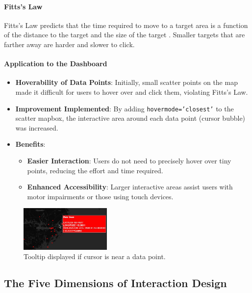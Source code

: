 \paragraph{Fitts's Law}

Fitts's Law predicts that the time required to move to a target area is a function of the distance to the target and the size of the target \cite{mccrocklinInteractionDesignData2015}. Smaller targets that are farther away are harder and slower to click.

\paragraph{Application to the Dashboard}

\begin{itemize}
    \item \textbf{Hoverability of Data Points}: Initially, small scatter points on the map made it difficult for users to hover over and click them, violating Fitts's Law. 
    \item \textbf{Improvement Implemented}: By adding \texttt{hovermode='closest'} to the scatter mapbox, the interactive area around each data point (cursor bubble) was increased. 
    \item \textbf{Benefits}: 
    \begin{itemize} 
        \item \textbf{Easier Interaction}: Users do not need to precisely hover over tiny points, reducing the effort and time required. 
        \item \textbf{Enhanced Accessibility}: Larger interactive areas assist users with motor impairments or those using touch devices. 
    \end{itemize} 
\end{itemize}

\begin{figure} 
    \centering 
    \includegraphics[width=0.4\textwidth]{figures/cursor_bubbles.jpg} 
    \caption{Tooltip displayed if cursor is near a data point.} 
    \label{fig:cursor_bubbles} 
\end{figure}

\subsection{The Five Dimensions of Interaction Design}

